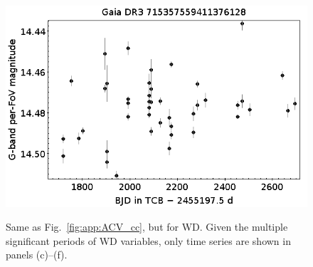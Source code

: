 \documentclass[longauth]{aa}
\begin{document}
\begin{appendix}
\begin{figure}
\hspace{2mm}
 \includegraphics[width=0.45\hsize]{figures/appendix/WD-0-0p0122.png} \\
\vspace{4mm}
 \caption{Same as Fig.~\ref{fig:app:ACV_cc}, but for WD. Given the multiple significant periods of WD variables, only time series are shown in panels (c)--(f).}
 \label{fig:app:WD_cc}
\end{figure}




\end{appendix}
\end{document}
